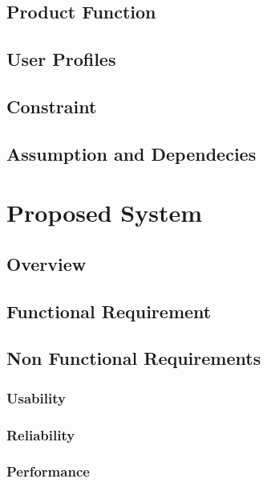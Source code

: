 \documentclass[11pt]{article}
\begin{document}
    \subsection{Product Function}

    \subsection{User Profiles}

    \subsection{Constraint}

    \subsection{Assumption and Dependecies}



\section{Proposed System}

    \subsection{Overview}

    \subsection{Functional Requirement}

        \subsubsection{}

    \subsection{Non Functional Requirements}
        
        \subsubsection{Usability}
        \subsubsection{Reliability}
        \subsubsection{Performance}
\end{document}
